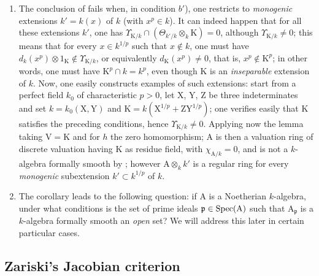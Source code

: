 \begin{remark}[22.5.10]
\label{0.22.5.10}
\begin{enumerate}
  \item[\rm{(i)}] The conclusion of  fails when, in condition $b'$), one restricts to \emph{monogenic} extensions $k'=k(x)$ of $k$ (with $x^p\in k$).
  It can indeed happen that for all these extensions $k'$, one has $\Upsilon_{\mathrm{K}/k}\cap(\Theta_{k'/k}\otimes_k\mathrm{K})=0$, although $\Upsilon_{\mathrm{K}/k}\neq 0$; this means that for every $x\in k^{1/p}$ such that $x\notin k$, one must have $d_k(x^p)\otimes 1_\mathrm{K}\notin\Upsilon_{\mathrm{K}/k}$, or equivalently $d_\mathrm{K}(x^p)\neq 0$, that is, $x^p\notin\mathrm{K}^p$; in other words, one must have $\mathrm{K}^p\cap k=k^p$, even though $\mathrm{K}$ is an \emph{inseparable} extension of $k$.
  Now, one easily constructs examples of such extensions: start from a perfect field $k_0$ of characteristic $p>0$, let $\mathrm{X}$, $\mathrm{Y}$, $\mathrm{Z}$ be three indeterminates and set $k=k_0(\mathrm{X},\mathrm{Y})$ and $\mathrm{K}=k(\mathrm{X}^{1/p}+\mathrm{Z}\mathrm{Y}^{1/p})$; one verifies easily that $\mathrm{K}$ satisfies the preceding conditions, hence $\Upsilon_{\mathrm{K}/k}\neq 0$.
  Applying now the lemma  taking $\mathrm{V}=\mathrm{K}$ and for $h$ the zero homomorphism; $\mathrm{A}$ is then a valuation ring of discrete valuation having $\mathrm{K}$ as residue field, with $\chi_{\mathrm{A}/k}=0$, and is not a $k$-algebra formally smooth by ; however $\mathrm{A}\otimes_kk'$ is a regular ring for every \emph{monogenic} subextension $k'\subset k^{1/p}$ of $k$.
  \item[\rm{(ii)}] The corollary  leads to the following question: if $\mathrm{A}$ is a Noetherian $k$-algebra, under what conditions is the set of prime ideals $\mathfrak{p}\in\operatorname{Spec}(\mathrm{A})$ such that $\mathrm{A}_\mathfrak{p}$ is a $k$-algebra formally smooth an \emph{open} set?
  We will address this later in certain particular cases.
\end{enumerate}
\end{remark}

\subsection{Zariski's Jacobian criterion}
\label{subsection:0.22.6}

